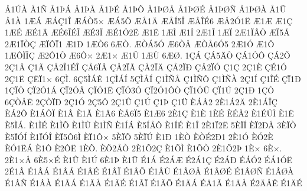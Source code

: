 {^^c51^^da^^c0
^^c51^^d1
^^c51^^de^^c1
^^c51^^de^^c5
^^c51^^de^^c9
^^c51^^de^^d5
^^c51^^de^^d8^^c5
^^c51^^de^^d8^^c9
^^c51^^de^^d8^^d1
^^c51^^de^^d8^^c0
^^c51^^dc
^^c51^^c0
1^^c6^^c1
^^c6^^c1^^c71^^ce
^^c6^^c1^^d25^^d7
^^c6^^c15^^d5
^^c6^^c51^^c4
^^c6^^c5^^cd5^^ce
^^c6^^c5^^ce^^c96
^^c6^^c52^^d31^^cb
^^c61^^c6
^^c61^^c7
1^^c6^^c9
^^c6^^c91^^c4
^^c6^^c96^^ce^^c9^^ce
^^c6^^c93^^cf
^^c6^^c91^^d32^^cb
^^c61^^cb
1^^c6^^cc
^^c61^^cd
2^^c61^^ce
1^^c6^^cf
2^^c61^^cf^^c2^^d2
^^c6^^cf5^^c5
2^^c61^^cf^^d2^^c7
^^c6^^cf^^d4^^cf1
^^c61^^d0
1^^c6^^d26
6^^c6^^d2.
^^c6^^d2^^c15^^d3
^^c66^^d2^^c5
^^c6^^d2^^c56^^d35
2^^c61^^d3
^^c61^^d4
1^^c6^^d4^^cf^^ce^^c7
^^c62^^d41^^d2
^^c66^^d4^^d7
2^^c61^^d7
^^c61^^db
1^^c6^^d9
6^^c6^^d8.
1^^c7^^c1
^^c7^^c15^^c4^^d2
^^c7^^c11^^d3^^d4
^^c7^^c12^^d5
2^^c71^^c2
^^c71^^c3
^^c7^^c52^^ce1^^c9^^ce
^^c7^^c56^^cf^^c2
^^c7^^c52^^cf^^c3
^^c7^^c52^^cf^^c4
^^c7^^c52^^cf^^d0
^^c7^^c52^^cf^^d3
^^c71^^c7
2^^c71^^c8
^^c7^^c91^^d3
2^^c71^^cb
^^c7^^cb^^cf1^^d7
6^^c7^^cc.
6^^c75^^cc^^c1^^ca
1^^c7^^cc^^c1^^cd
5^^c7^^cc^^c5^^cd
^^c71^^cc^^d1^^c5
^^c71^^cc^^d1^^d4
^^c71^^cc^^d1^^c0
2^^c71^^cd
^^c71^^ce^^c9
^^c7^^cf1^^d0
1^^c7^^cf^^d2
^^c7^^cf2^^d31^^c1
^^c7^^cf2^^d3^^c2
^^c7^^cf^^d31^^cb
^^c7^^cf^^d33^^d3
^^c7^^cf2^^d31^^d4^^d2
^^c7^^cf1^^d3^^db
^^c7^^cf1^^da
2^^c71^^d0
1^^c7^^d2
6^^c7^^d2^^c5^^cb
2^^c7^^d2^^cf^^d0
2^^c71^^d3
2^^c75^^d4
2^^c71^^db
^^c71^^da
^^c71^^de
^^c71^^dc
^^c8^^c1^^c22
2^^c81^^c12^^c4
2^^c81^^c1^^ce^^c7
^^c8^^c12^^d4
^^c81^^c1^^d4^^cf
^^c81^^c2
^^c81^^c3
^^c81^^c46
^^c8^^c56^^cf5
^^c81^^c66
2^^c81^^c7
^^c81^^c8
1^^c8^^c9
^^c8^^c9^^c52
^^c81^^c9^^da^^cc
^^c81^^cb
^^c85^^cc^^c1.
^^c81^^cc^^c9
^^c81^^cc^^d5
^^c81^^cc^^d9
^^c81^^cc^^d1
^^c81^^cd^^c1
^^c85^^cd^^c5^^d4
^^c81^^cd^^c9
^^c81^^ce
2^^c81^^cf2^^cb
5^^c8^^cf^^cd
^^c8^^cf2^^d0^^c5
3^^c8^^cf^^d2
^^c85^^cf^^d3^^cd
^^c81^^cf^^d3^^ce
^^c8^^cf5^^d46^^cc
^^c8^^cf1^^d4^^d7
5^^c8^^cf^^d5
5^^c8^^cf^^da
^^c81^^d0
1^^c8^^d2
^^c8^^d2^^c92^^d01
2^^c81^^d3
^^c8^^d32^^c8
^^c8^^d31^^cb^^c1
^^c81^^d4
^^c82^^d4^^cb
1^^c8^^d5.
^^c8^^d52^^c5^^d2
2^^c81^^d52^^c7
^^c81^^d5^^cc
^^c81^^d5^^d2
2^^c81^^d52^^de
1^^c8^^d7
6^^c8^^d7.
2^^c81^^d7^^c5
6^^c85^^d7^^c9
^^c81^^db
^^c81^^da
6^^c81^^de
^^c81^^dc
^^c91^^c1
^^c92^^c1^^c6
^^c92^^c11^^c7
^^c92^^c1^^d0
^^c9^^c1^^d32
^^c9^^c11^^d3^^cb
2^^c91^^c2
^^c91^^c2^^c1
^^c91^^c2^^c5
^^c91^^c2^^c9
^^c91^^c2^^cf
^^c91^^c2^^d5
^^c91^^c2^^d9
^^c91^^c2^^d8^^c5
^^c91^^c2^^d8^^c9
^^c91^^c2^^d8^^d1
^^c91^^c2^^d8^^c0
^^c91^^c2^^d1
^^c91^^c2^^c0
^^c91^^c3^^c1
^^c91^^c3^^c5
^^c91^^c3^^c9
^^c91^^c3^^cf
^^c91^^c3^^d5
^^c91^^c4^^c1
^^c9^^c41^^c3
^^c91^^c4^^c5
^^c92^^c4^^c5^^ca
^^c91^^c4^^c9
}

